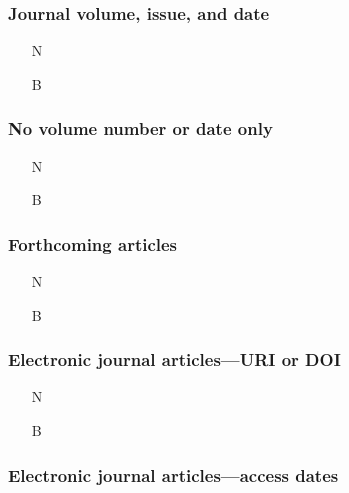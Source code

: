 \documentclass[11pt,letterpaper,oneside]{article}
\begin{document}
\setcounter{subsubsection}{179}
\subsubsection{Journal volume, issue, and date}

\begin{itemize}
\item[N] 

\item[B] 
\end{itemize}

\setcounter{subsubsection}{180}
\subsubsection{No volume number or date only}

\begin{itemize}
\item[N] 

\item[B] 
\end{itemize}

\subsubsection{Forthcoming articles}

\begin{itemize}
\item[N] 

\item[B] 
\end{itemize}

\setcounter{subsubsection}{183}
\subsubsection{Electronic journal articles---URI or DOI}

\begin{itemize}
\item[N] 

\item[B] 
\end{itemize}

\subsubsection{Electronic journal articles---access dates}
\end{document}
